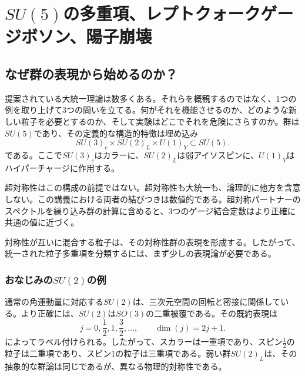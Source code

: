 \chapter{\texorpdfstring{\(SU(5)\)}{SU(5)}の多重項、レプトクォークゲージボソン、陽子崩壊}


\section{なぜ群の表現から始めるのか？}

提案されている大統一理論は数多くある。それらを概観するのではなく、1つの例を取り上げて3つの問いを立てる。何がそれを機能させるのか、どのような新しい粒子を必要とするのか、そして実験はどこでそれを危険にさらすのか。群は\(SU(5)\)であり、その定義的な構造的特徴は埋め込み
\begin{equation}
SU(3)_c\times SU(2)_L\times U(1)_Y
\subset SU(5).
\label{eq:l10-sm-embedding}
\end{equation}
である。ここで\(SU(3)_c\)はカラーに、\(SU(2)_L\)は弱アイソスピンに、\(U(1)_Y\)はハイパーチャージに作用する。

超対称性はこの構成の前提ではない。超対称性も大統一も、論理的に他方を含意しない。この講義における両者の結びつきは数値的である。超対称パートナーのスペクトルを繰り込み群の計算に含めると、3つのゲージ結合定数はより正確に共通の値に近づく。

対称性が互いに混合する粒子は、その対称性群の表現を形成する。したがって、統一された粒子多重項を分類するには、まず少しの表現論が必要である。

\subsection{おなじみの\texorpdfstring{\(SU(2)\)}{SU(2)}の例}

通常の角運動量に対応する\(SU(2)\)は、三次元空間の回転と密接に関係している。より正確には、\(SU(2)\)は\(SO(3)\)の二重被覆である。その既約表現は
\begin{equation}
j=0,\frac12,1,\frac32,\ldots,
\qquad
\dim(j)=2j+1.
\label{eq:l10-su2-spins}
\end{equation}
によってラベル付けられる。したがって、スカラーは一重項であり、スピン\(\tfrac12\)の粒子は二重項であり、スピン1の粒子は三重項である。弱い群\(SU(2)_L\)は、その抽象的な群論は同じであるが、異なる物理的対称性である。

